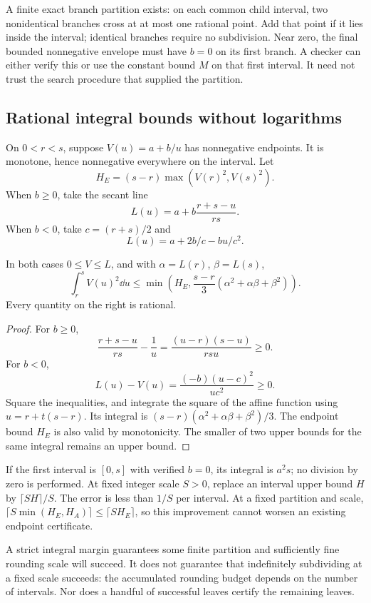 A finite exact branch partition exists: on each common child
interval, two nonidentical branches cross at at most one rational
point. Add that point if it lies inside the interval; identical
branches require no subdivision. Near zero, the final bounded
nonnegative envelope must have \(b=0\) on its first branch. A checker
can either verify this or use the constant bound \(M\) on that first
interval. It need not trust the search procedure that supplied the
partition.

\subsection{Rational integral bounds without logarithms}
On \(0<r<s\), suppose \(V(u)=a+b/u\) has nonnegative endpoints.
It is monotone, hence nonnegative everywhere on the interval.
Let
\[
 H_E=(s-r)\max(V(r)^2,V(s)^2).
\]
When \(b\ge0\), take the secant line
\[
 L(u)=a+b\frac{r+s-u}{rs}.
\]
When \(b<0\), take \(c=(r+s)/2\) and
\[
 L(u)=a+2b/c-bu/c^2.
\]
\begin{lemma}\label{lem:affine}
In both cases \(0\le V\le L\), and with
\(\alpha=L(r)\), \(\beta=L(s)\),
\begin{equation}\label{eq:affine}
 \int_r^sV(u)^2\dd u
 \le\min\left(H_E,\frac{s-r}{3}
                       (\alpha^2+\alpha\beta+\beta^2)\right).
\end{equation}
Every quantity on the right is rational.
\end{lemma}
\begin{proof}
For \(b\ge0\),
\[
 \frac{r+s-u}{rs}-\frac1u=\frac{(u-r)(s-u)}{rsu}\ge0.
\]
For \(b<0\),
\[
 L(u)-V(u)=\frac{(-b)(u-c)^2}{uc^2}\ge0.
\]
Square the inequalities, and integrate the square of the affine
function using \(u=r+t(s-r)\). Its integral is
\((s-r)(\alpha^2+\alpha\beta+\beta^2)/3\).
The endpoint bound \(H_E\) is also valid by monotonicity. The smaller
of two upper bounds for the same integral remains an upper bound.
\end{proof}

If the first interval is \([0,s]\) with verified \(b=0\), its
integral is \(a^2s\); no division by zero is performed.
At fixed integer scale \(S>0\), replace an interval upper bound
\(H\) by \(\lceil SH\rceil/S\). The error is less than \(1/S\)
per interval. At a fixed partition and scale,
\(\lceil S\min(H_E,H_A)\rceil\le\lceil SH_E\rceil\), so this
improvement cannot worsen an existing endpoint certificate.

A strict integral margin guarantees some finite partition and
sufficiently fine rounding scale will succeed. It does not guarantee
that indefinitely subdividing at a fixed scale succeeds: the
accumulated rounding budget depends on the number of intervals.
Nor does a handful of successful leaves certify the remaining leaves.

